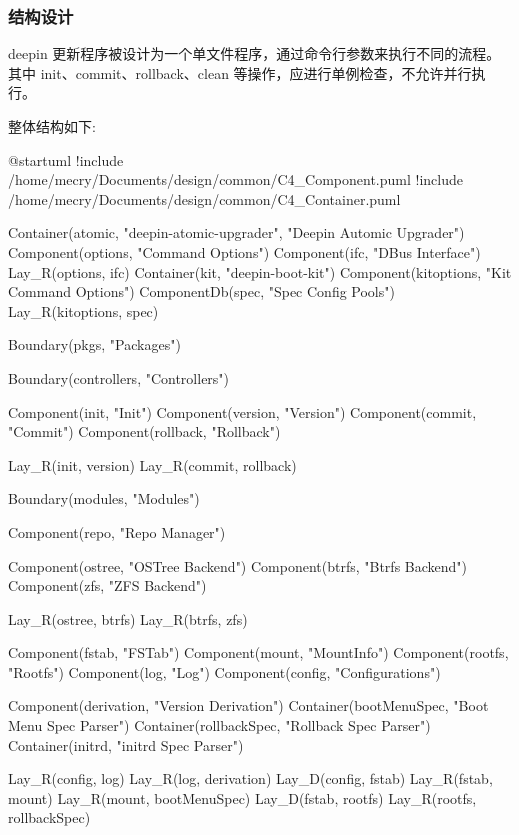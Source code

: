 \documentclass{utart}
\begin{document}
\subsubsection{结构设计}
deepin 更新程序被设计为一个单文件程序，通过命令行参数来执行不同的流程。
其中 init、commit、rollback、clean 等操作，应进行单例检查，不允许并行执行。

整体结构如下:
\begin{center}
  \begin{adjustbox}{scale=0.75}
    \begin{plantuml}
      @startuml
      !include /home/mecry/Documents/design/common/C4_Component.puml
      !include /home/mecry/Documents/design/common/C4_Container.puml

      Container(atomic, "deepin-atomic-upgrader", "Deepin Automic Upgrader") {
        Component(options, "Command Options")
        Component(ifc, "DBus Interface")
        Lay_R(options, ifc)
      }
      Container(kit, "deepin-boot-kit") {
        Component(kitoptions, "Kit Command Options")
        ComponentDb(spec, "Spec Config Pools")
        Lay_R(kitoptions, spec)
      }

      Boundary(pkgs, "Packages") {
        Boundary(controllers, "Controllers") {
          Component(init, "Init")
          Component(version, "Version")
          Component(commit, "Commit")
          Component(rollback, "Rollback")

          Lay_R(init, version)
          Lay_R(commit, rollback)
        }

        Boundary(modules, "Modules") {
          Component(repo, "Repo Manager") {
            Component(ostree, "OSTree Backend")
            Component(btrfs, "Btrfs Backend")
            Component(zfs, "ZFS Backend")

            Lay_R(ostree, btrfs)
            Lay_R(btrfs, zfs)
          }
          Component(fstab, "FSTab")
          Component(mount, "MountInfo")
          Component(rootfs, "Rootfs")
          Component(log, "Log")
          Component(config, "Configurations")

          Component(derivation, "Version Derivation")
          Container(bootMenuSpec, "Boot Menu Spec Parser")
          Container(rollbackSpec, "Rollback Spec Parser")
          Container(initrd, "initrd Spec Parser")

          Lay_R(config, log)
          Lay_R(log, derivation)
          Lay_D(config, fstab)
          Lay_R(fstab, mount)
          Lay_R(mount, bootMenuSpec)
          Lay_D(fstab, rootfs)
          Lay_R(rootfs, rollbackSpec)

}}
\end{plantuml}
\end{adjustbox}
\end{center}
\end{document}
